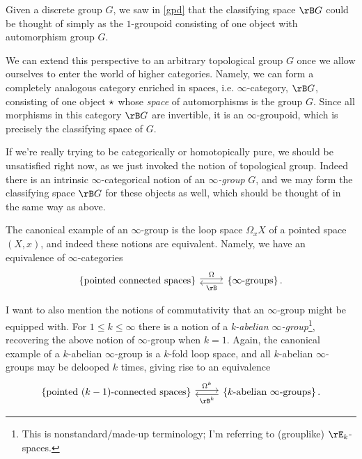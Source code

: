 \begin{nothing}
  \label{classify-deloop}
  Given a discrete group $G$, we saw in \cref{gpd} that the classifying space $\rB G$ could be thought of simply as the $1$-groupoid consisting of one object with automorphism group $G$.

  We can extend this perspective to an arbitrary topological group $G$ once we allow ourselves to enter the world of higher categories. Namely, we can form a completely analogous category enriched in spaces, i.e. $\infty$-category, $\rB G$, consisting of one object $\star$ whose \emph{space} of automorphisms is the group $G$. Since all morphisms in this category $\rB G$ are invertible, it is an $\infty$-groupoid, which is precisely the classifying space of $G$.

  \begin{subremark}
    \label{classify-deloop-cat}
    If we're really trying to be categorically or homotopically pure, we should be unsatisfied right now, as we just invoked the notion of topological group. Indeed there is an intrinsic $\infty$-categorical notion of an \emph{$\infty$-group} $G$, and we may form the classifying space $\rB G$ for these objects as well, which should be thought of in the same way as above.

    The canonical example of an $\infty$-group is the loop space $\Omega_xX$ of a pointed space $(X,x)$, and indeed these notions are equivalent. Namely, we have an equivalence of $\infty$-categories
    \[
      \begin{tikzcd}
        \l\{ \text{pointed connected spaces} \r\} \ar[r, "\Omega", shift left=0.5ex] &
          \l\{ \infty\text{-groups} \r\}. \ar[l, "\rB", shift left=0.5ex]
      \end{tikzcd}
    \]

    I want to also mention the notions of commutativity that an $\infty$-group might be equipped with. For $1 \le k \le \infty$ there is a notion of a \emph{k-abelian $\infty$-group}\footnote{This is nonstandard/made-up terminology; I'm referring to (grouplike) $\rE_k$-spaces.}, recovering the above notion of $\infty$-group when $k=1$. Again, the canonical example of a $k$-abelian $\infty$-group is a $k$-fold loop space, and all $k$-abelian $\infty$-groups may be delooped $k$ times, giving rise to an equivalence
    \begin{equation}
      \label{classify-deloop-cat-equiv}
      \begin{tikzcd}
        \l\{ \text{pointed}\ (k-1)\text{-connected spaces} \r\} \ar[r, "\Omega^k", shift left=0.5ex] &
          \l\{ k\text{-abelian}\ \infty\text{-groups} \r\}. \ar[l, "\rB^k", shift left=0.5ex]
      \end{tikzcd}
    \end{equation}
  \end{subremark}
\end{nothing}

